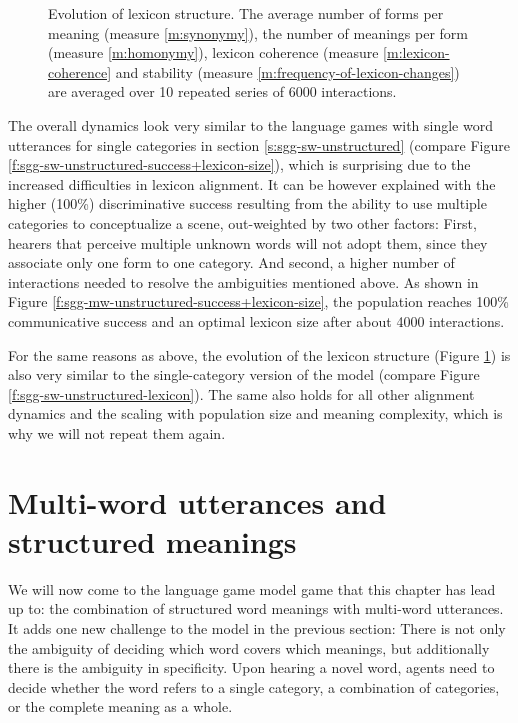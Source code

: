 \begin{figure}[t]
  \caption{Evolution of lexicon structure. The average number of forms
    per meaning (measure \ref{m:synonymy}), the number of meanings per
    form (measure \ref{m:homonymy}), lexicon coherence (measure
    \ref{m:lexicon-coherence} and stability (measure
    \ref{m:frequency-of-lexicon-changes}) are averaged over 10
    repeated series of 6000 interactions.}
  \label{f:sgg-mw-unstructured-lexicon}
\end{figure}

\stopfiguregroup

The overall dynamics look very similar to the language games with
single word utterances for single categories in section
\ref{s:sgg-sw-unstructured} (compare Figure
\ref{f:sgg-sw-unstructured-success+lexicon-size}), which is surprising
due to the increased difficulties in lexicon alignment. It can be
however explained with the higher (100\%) discriminative success
resulting from the ability to use multiple categories to conceptualize
a scene, out-weighted by two other factors: First, hearers that
perceive multiple unknown words will not adopt them, since they
associate only one form to one category. And second, a higher number
of interactions needed to resolve the ambiguities mentioned above. As
shown in Figure \ref{f:sgg-mw-unstructured-success+lexicon-size}, the
population reaches 100\% communicative success and an optimal lexicon
size after about 4000 interactions.



For the same reasons as above, the evolution of the lexicon structure
(Figure \ref{f:sgg-mw-unstructured-lexicon}) is also very similar to
the single-category version of the model (compare Figure
\ref{f:sgg-sw-unstructured-lexicon}). The same also holds for all
other alignment dynamics and the scaling with population size and
meaning complexity, which is why we will not repeat them again.


\section{Multi-word utterances and structured meanings}
\label{s:sgg-mw-structured}


We will now come to the language game model game that this chapter has
lead up to: the combination of structured word meanings with
multi-word utterances. It adds one new challenge to the model in the
previous section: There is not only the ambiguity of deciding which
word covers which meanings, but additionally there is the ambiguity in
specificity. Upon hearing a novel word, agents need to decide whether
the word refers to a single category, a combination of categories, or
the complete meaning as a whole.



